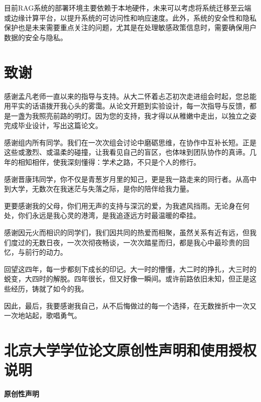 \documentclass[12pt, a4paper]{ctexart}
\begin{document}
目前RAG系统的部署环境主要依赖于本地硬件，未来可以考虑将系统迁移至云端或边缘计算平台，以提升系统的可访问性和响应速度。此外，系统的安全性和隐私保护也是未来需要重点关注的问题，尤其是在处理敏感政策信息时，需要确保用户数据的安全与隐私。

\newpage




\newpage
\section{致谢}

感谢孟凡老师一直以来的指导与支持。从大二怀着忐忑初次走进组会时起，您总能用平实的话语拨开我心头的雾霭。从论文开题到实验设计，每一次指导与反馈，都是一盏为我照亮前路的明灯。因为您的支持，我才得以从稚嫩中走出，以独立之姿完成毕业设计，写出这篇论文。

感谢组内所有同学。我们在一次次组会讨论中磨砺思维，在协作中互补长短。正是这些或激烈、或温柔的碰撞，让我看见自己的盲区，也体味到团队协作的真谛。几年的相知相伴，使我深刻懂得：学术之路，不只是个人的修行。

感谢晋康玮同学，你不仅是青葱岁月里的知己，更是我一路走来的同行者。从高中到大学，无数次在我迷茫与失落之际，是你的陪伴给我力量。

更要感谢我的父母，你们用无声的支持与深沉的爱，为我遮风挡雨。无论身在何处，你们永远是我心灵的港湾，是我追逐远方时最温暖的牵挂。

感谢因元火而相识的同学们，我们因共同的热爱而相聚，虽然关系有近有远，但我们度过的无数日夜，一次次彻夜畅谈，一次次踏星而归，都是我心中最珍贵的回忆，与前行的动力。

回望这四年，每一步都刻下成长的印记。大一时的懵懂，大二时的挣扎，大三时的蜕变，大四时的解脱。四年很长，但又好像一瞬间。或许前路依旧未知，但正是这些经历，铸就了如今的我。

因此，最后，我要感谢我自己，从不后悔做过的每一个选择，在无数挫折中一次又一次地站起，歌唱勇气。


\newpage
\section{北京大学学位论文原创性声明和使用授权说明}

\vspace{1em} %

\begin{center}
    \textbf{原创性声明}
\end{center}
\end{document}
